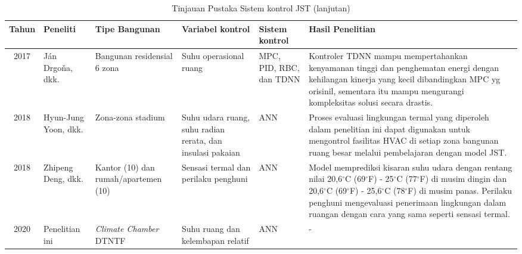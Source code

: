 \begin{landscape}
	\begin{table}[hbt!]
		\caption{Tinjauan Pustaka Sistem kontrol JST (lanjutan)}
		\label{tbl:2:studiANN2}
		\centering
		\begin{tabular}{|c|p{2.8cm}|p{3cm}|p{2.8cm}|p{3.5cm}|p{7cm}|}
			\hline
			
			Tahun & Peneliti & Tipe Bangunan & Variabel kontrol & Sistem kontrol & Hasil Penelitian \\ \hline
			
			2017 \cite{article15} & Ján Drgoňa, dkk. & Bangunan residensial 6 zona & Suhu operasional ruang & MPC, PID, RBC, dan TDNN & Kontroler TDNN mampu mempertahankan kenyamanan tinggi dan penghematan energi dengan kehilangan kinerja yang kecil dibandingkan MPC yg orisinil, sementara itu mampu mengurangi kompleksitas solusi secara drastis. \\ \hline
			
			2018 \cite{article16} & Hyun-Jung Yoon, dkk. & Zona-zona stadium & Suhu udara ruang, suhu radian rerata, dan insulasi pakaian & ANN & Proses evaluasi lingkungan termal yang diperoleh dalam penelitian ini dapat digunakan untuk mengontrol fasilitas HVAC di setiap zona bangunan ruang besar melalui pembelajaran dengan model JST. \\ \hline
			
			2018 \cite{article17} & Zhipeng Deng, dkk. & Kantor (10) dan rumah/apartemen (10) & Sensasi termal dan perilaku penghuni & ANN & Model memprediksi kisaran suhu udara dengan rentang nilai 20,6$^{\circ}$C (69$^{\circ}$F) - 25$^{\circ}$C (77$^{\circ}$F) di musim dingin dan 20,6$^{\circ}$C (69$^{\circ}$F) - 25,6$^{\circ}$C (78$^{\circ}$F) di musim panas. Perilaku penghuni mengevaluasi penerimaan lingkungan dalam ruangan dengan cara yang sama seperti sensasi termal.\\ \hline
			
			2020 & Penelitian ini & \textit{Climate Chamber} DTNTF & Suhu ruang dan kelembapan relatif & ANN & - \\ \hline
		\end{tabular}
	\end{table}
\end{landscape}

